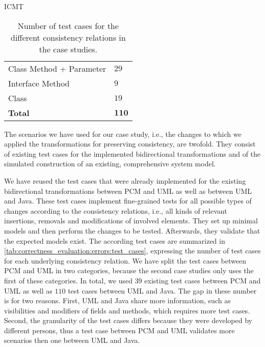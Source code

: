 \begin{copiedFrom}{ICMT}
\begin{table}
\begin{tabular}{L{13em}C{8em}}
        Class Method + Parameter    & $29$ \\
        Interface Method            & $9$ \\
        Class                       & $19$ \\\addlinespace[0.3em]
        \textbf{Total}              & $\mathbf{110}$ \\
        \bottomrule
    \end{tabular}
    \caption[Number of test cases for case studies]{Number of test cases for the different consistency relations in the case studies.} %
    \label{tab:correctness_evaluation:errors:test_cases}
\end{table}

The scenarios we have used for our case study, i.e., the changes to which we applied the transformations for preserving consistency, are twofold.
They consist of existing test cases for the implemented bidirectional transformations and of the simulated construction of an existing, comprehensive system model.

We have reused the test cases that were already implemented for the existing bidirectional transformations between \gls{PCM} and \gls{UML} as well as between \gls{UML} and Java.
These test cases implement fine-grained tests for all possible types of changes according to the consistency relations, i.e., all kinds of relevant insertions, removals and modifications of involved elements.
They set up minimal models and then perform the changes to be tested.
Afterwards, they validate that the expected models exist.
The according test cases are summarized in \autoref{tab:correctness_evaluation:errors:test_cases}, expressing the number of test cases for each underlying consistency relation.
We have split the test cases between \gls{PCM} and \gls{UML} in two categories, because the second case studies only uses the first of these categories.
In total, we used $39$ existing test cases between \gls{PCM} and \gls{UML} as well as $110$ test cases between \gls{UML} and Java.
The gap in these number is for two reasons. First, \gls{UML} and Java share more information, such as visibilities and modifiers of fields and methods, which requires more test cases. Second, the granularity of the test cases differs because they were developed by different persons, thus a test case between \gls{PCM} and \gls{UML} validates more scenarios then one between \gls{UML} and Java.


\end{copiedFrom}
